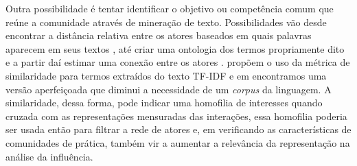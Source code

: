 Outra possibilidade é tentar identificar o objetivo ou competência comum que
reúne a comunidade através de mineração de texto. Possibilidades vão desde
encontrar a distância relativa entre os atores baseados em quais palavras
aparecem em seus textos \citep{Reichling2005}, até criar uma ontologia dos termos
propriamente dito e a partir daí estimar uma conexão entre os atores
\citep{Mori2006}. \citet{Spertus2005} propõem o uso da métrica de similaridade
para termos extraídos do texto TF-IDF \citep{Salton1989, Frakes1992} e em
\citet{MATSUO2007} encontramos uma versão aperfeiçoada que diminui a necessidade
de um \emph{corpus} da linguagem. A similaridade, dessa forma, pode indicar uma
homofilia de interesses quando cruzada com as representações mensuradas das
interações, essa homofilia poderia ser usada então para filtrar a rede de atores
e, em verificando as características de comunidades de prática, também vir a
aumentar a relevância da representação na análise da influência.